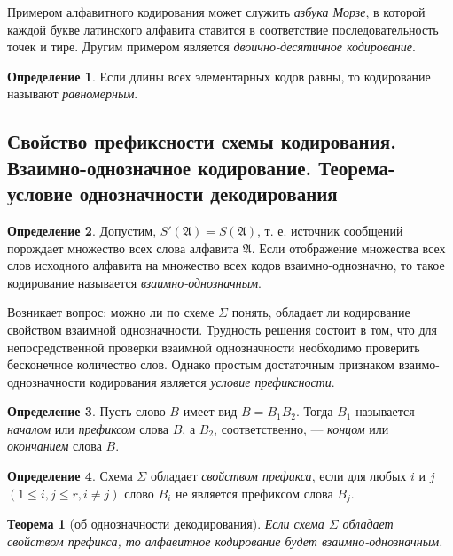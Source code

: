 \documentclass{article}
\newtheorem*{theorem*}{Теорема}
\theoremstyle{plain}
\theoremstyle{definition}
\newtheorem{definition}{Определение}[subsection]
\begin{document}
Примером алфавитного кодирования может служить \textit{азбука Морзе}, в которой каждой букве латинского алфавита ставится в соответствие последовательность точек и тире. Другим примером является \textit{двоично-десятичное кодирование}.

\begin{definition}
	Если длины всех элементарных кодов равны, то кодирование называют \textit{равномерным}.
\end{definition}

\subsection{Свойство префиксности схемы кодирования. Взаимно-однозначное кодирование. Теорема-условие однозначности декодирования}

\begin{definition}
	Допустим, \(S'(\mathfrak{A}) = S(\mathfrak{A})\), т. е. источник сообщений порождает множество всех слова алфавита \(\mathfrak{A}\). Если отображение множества всех слов исходного алфавита на множество всех кодов взаимно-однозначно, то такое кодирование называется \textit{взаимно-однозначным}.
\end{definition}

Возникает вопрос: можно ли по схеме \(\Sigma\) понять, обладает ли кодирование свойством взаимной однозначности. Трудность решения состоит в том, что для непосредственной проверки взаимной однозначности необходимо проверить бесконечное количество слов. Однако простым достаточным признаком взаимо-однозначности кодирования является \textit{условие префиксности}.

\begin{definition}
	Пусть слово \(B\) имеет вид \(B = B_1B_2\). Тогда \(B_1\) называется \textit{началом} или \textit{префиксом} слова \(B\), а \(B_2\), соответственно, --- \textit{концом} или \textit{окончанием} слова \(B\).
\end{definition}

\begin{definition}
	Схема \(\Sigma\) обладает \textit{свойством префикса}, если для любых \(i\) и \(j\) \((1 \leq i, j \leq r, i \neq j)\) слово \(B_i\) не является префиксом слова \(B_j\).
\end{definition}

\begin{theorem*}[об однозначности декодирования]
	Если схема \(\Sigma\) обладает свойством префикса, то алфавитное кодирование будет взаимно-однозначным.
\end{theorem*}
\end{document}
